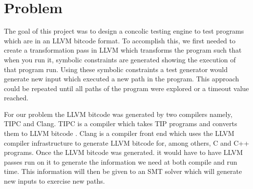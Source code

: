 \section{Problem}

The goal of this project was to design a concolic testing engine to test programs which are in an LLVM bitcode format. To accomplish this, we first needed to create a transformation pass in LLVM which transforms the program such that when you run it, symbolic constraints are generated showing the execution of that program run. Using these symbolic constraints a test generator would generate new input which executed a new path in the program. This approach could be repeated until all paths of the program were explored or a timeout value reached.

For our problem the LLVM bitcode was generated by two compilers namely, TIPC and Clang. TIPC is a compiler which takes TIP\cite{tip} programs and converts them to LLVM bitcode \cite{tipc}. Clang is a compiler front end which uses the LLVM compiler infrastructure to generate LLVM bitcode for, among others, C and C++ programs. Once the LLVM bitcode was generated. it would have to have LLVM passes run on it to generate the information we need at both compile and run time. This information will then be given to an SMT solver which will generate new inputs to exercise new paths.